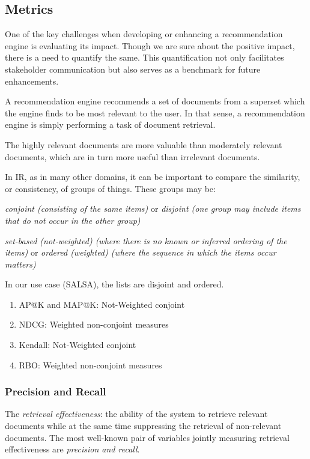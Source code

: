 \subsection{Metrics}
\label{subsec:IR-Metrics}
One of the key challenges when developing or enhancing a recommendation engine is evaluating its impact. Though we are sure about the positive impact, there is a need to quantify the same. This quantification not only facilitates stakeholder communication but also serves as a benchmark for future enhancements.

A recommendation engine recommends a set of documents from a superset which the engine finds to be most relevant to the user. In that sense, a recommendation engine is simply performing a task of document retrieval.

The highly relevant documents are more valuable than moderately relevant documents, which are in turn more useful than irrelevant documents.

In IR, as in many other domains, it can be important to compare the similarity, or consistency, of groups of things. These groups may be:

\begin{description}
	\item \emph{conjoint (consisting of the same items)} or \emph{disjoint (one group may include items that do not occur in the other group)}
	\item \emph{set-based (not-weighted) (where there is no known or inferred ordering of the items)} or \emph{ordered (weighted) (where the sequence in which the items occur matters)}
\end{description}

In our use case (SALSA), the lists are disjoint and ordered.
\begin{enumerate}
	\item AP@K and MAP@K: Not-Weighted conjoint
	\item NDCG: Weighted non-conjoint measures
	\item Kendall: Not-Weighted conjoint
	\item RBO: Weighted non-conjoint measures
\end{enumerate}

\subsubsection{Precision and Recall}
\label{Precision and Recall}
The \emph{retrieval effectiveness}: the ability of the system to retrieve relevant documents while at the same time suppressing the retrieval of non-relevant documents. 
The most well-known pair of variables jointly measuring retrieval effectiveness are \emph{precision and recall}.


